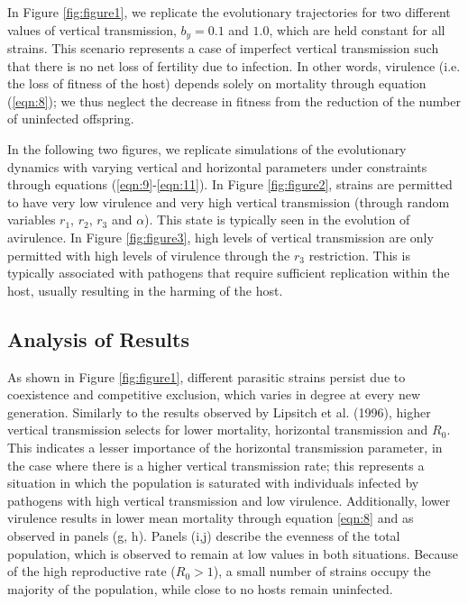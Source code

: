 In Figure \ref{fig:figure1}, we replicate the evolutionary trajectories for two different values of vertical transmission, $b_y = 0.1$ and $1.0$, which are held constant for all strains. This scenario represents a case of imperfect vertical transmission such that there is no net loss of fertility due to infection. In other words, virulence (i.e. the loss of fitness of the host) depends solely on mortality through equation (\ref{eqn:8}); we thus neglect the decrease in fitness from the reduction of the number of uninfected offspring.  

In the following two figures, we replicate simulations of the evolutionary dynamics with varying vertical and horizontal parameters under constraints through equations (\ref{eqn:9}-\ref{eqn:11}). In Figure \ref{fig:figure2}, strains are permitted to have very low virulence and very high vertical transmission (through random variables $r_1$, $r_2$, $r_3$ and $\alpha$). This state is typically seen in the evolution of avirulence. In Figure \ref{fig:figure3}, high levels of vertical transmission are only permitted with high levels of virulence through the $r_3$ \in [0, \[r_1\]] restriction. This is typically associated with pathogens that require sufficient replication within the host, usually resulting in the harming of the host. 

\subsection{Analysis of Results}
As shown in Figure \ref{fig:figure1}, different parasitic strains persist due to coexistence and competitive exclusion, which varies in degree at every new generation. Similarly to the results observed by Lipsitch et al. (1996)\supercite{Lipsitch:1996}, higher vertical transmission selects for lower mortality, horizontal transmission and $R_0$. This indicates a lesser importance of the horizontal transmission parameter, in the case where there is a higher vertical transmission rate; this represents a situation in which the population is saturated with individuals infected by pathogens with high vertical transmission and low virulence. Additionally, lower virulence results in lower mean mortality through equation \ref{eqn:8} and as observed in panels (g, h). Panels (i,j) describe the evenness of the total population, which is observed to remain at low values in both situations. Because of the high reproductive rate ($R_0 > 1$), a small number of strains occupy the majority of the population, while close to no hosts remain uninfected. 
 
